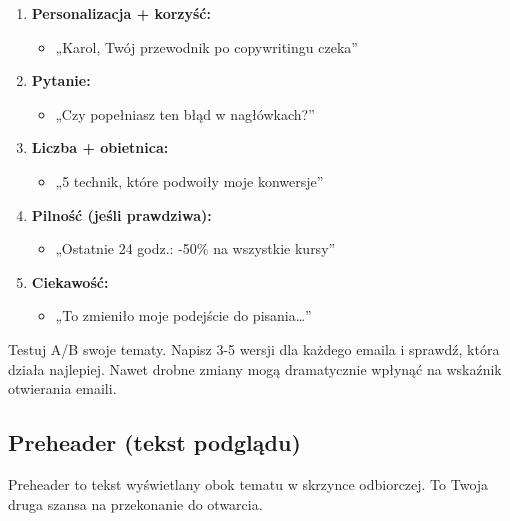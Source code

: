 \documentclass[
  12pt,
  a4paper,
  twoside,
  openright,
  12pt,
  DIV=12,
  BCOR=12mm]{scrbook}
\providecommand{\tightlist}{%
  \setlength{\itemsep}{0pt}\setlength{\parskip}{0pt}}\usepackage{longtable,booktabs,array}
\begin{document}
\begin{enumerate}
\def\labelenumi{\arabic{enumi}.}
\tightlist
\item
  \textbf{Personalizacja + korzyść:}

  \begin{itemize}
  \tightlist
  \item
    „Karol, Twój przewodnik po copywritingu czeka''
  \end{itemize}
\item
  \textbf{Pytanie:}

  \begin{itemize}
  \tightlist
  \item
    „Czy popełniasz ten błąd w nagłówkach?''
  \end{itemize}
\item
  \textbf{Liczba + obietnica:}

  \begin{itemize}
  \tightlist
  \item
    „5 technik, które podwoiły moje konwersje''
  \end{itemize}
\item
  \textbf{Pilność (jeśli prawdziwa):}

  \begin{itemize}
  \tightlist
  \item
    „Ostatnie 24 godz.: -50\% na wszystkie kursy''
  \end{itemize}
\item
  \textbf{Ciekawość:}

  \begin{itemize}
  \tightlist
  \item
    „To zmieniło moje podejście do pisania\ldots''
  \end{itemize}
\end{enumerate}

\begin{wskazowka}
Testuj A/B swoje tematy. Napisz 3-5 wersji dla każdego emaila i sprawdź, która działa najlepiej. Nawet drobne zmiany mogą dramatycznie wpłynąć na wskaźnik otwierania emaili.
\end{wskazowka}

\subsection{Preheader (tekst
podglądu)}\label{preheader-tekst-podglux105du}

Preheader to tekst wyświetlany obok tematu w skrzynce odbiorczej. To
Twoja druga szansa na przekonanie do otwarcia.
\end{document}
